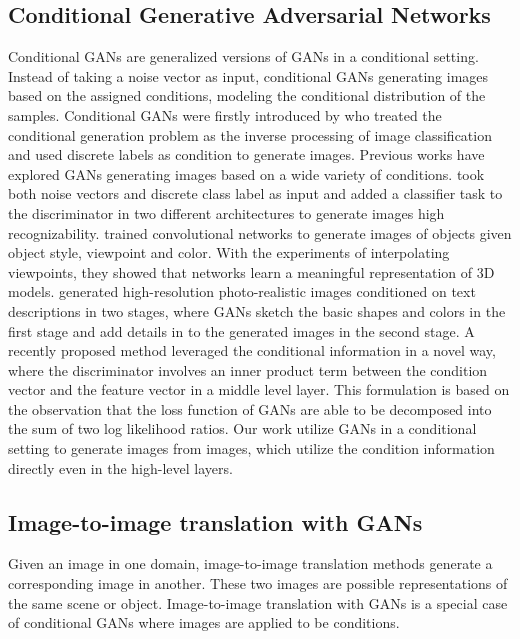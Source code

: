 \subsection{Conditional Generative Adversarial Networks}
Conditional GANs are generalized versions of GANs in a conditional setting. Instead of taking a noise vector as input, conditional GANs generating images based on the assigned conditions, modeling the conditional distribution of the samples. 
Conditional GANs were firstly introduced by \cite{cGANs} who treated the conditional generation problem as the inverse processing of image classification and used discrete labels as condition to generate images. Previous works have explored GANs generating images based on a wide variety of conditions.
\cite{InfoGANs, ACGANs} took both noise vectors and discrete class label as input and added a classifier task to the discriminator in two different architectures to generate images high recognizability.   
%
\cite{3DGANs} trained convolutional networks to generate images of objects given object style, viewpoint and color. With the experiments of interpolating viewpoints, they showed that networks learn a meaningful representation of 3D models. 
%
\cite{StackGANs, StackGANs++} generated high-resolution photo-realistic images conditioned on text descriptions in two stages, where GANs sketch the basic shapes and colors in the first stage and add details in to the generated images in the second stage.  
%
A recently proposed method\cite{cGAN-projection} leveraged the conditional information in a novel way, where the discriminator involves an inner product term between the condition vector and the feature vector in a middle level layer. This formulation is based on the observation that the loss function of GANs are able to be decomposed into the sum of two log likelihood ratios.
%
Our work utilize GANs in a conditional setting to generate images from images, which utilize the condition information directly even in the high-level layers.
%
%
\subsection{Image-to-image translation with GANs}
Given an image in one domain, image-to-image translation methods generate a corresponding image in another. These two images are possible representations of the same scene or object. Image-to-image translation with GANs is a special case of conditional GANs where images are applied to be conditions. 
%


